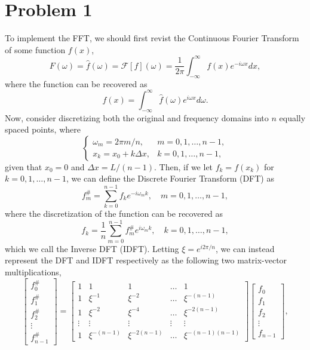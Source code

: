 \documentclass[11pt]{article}
\begin{document}
\section{Problem 1}
To implement the FFT, we should first revist the Continuous Fourier Transform of some function $f(x)$,
	\begin{equation*}
		F(\omega) = \hat{f}(\omega) = \mathcal{F}\left[f\right](\omega) = \frac{1}{2\pi}\int_{-\infty}^{\infty}{f(x)e^{-i\omega x}dx},
	\end{equation*}
where the function can be recovered as
	\begin{equation*}
		f(x) = \int_{-\infty}^{\infty}{\hat{f}(\omega)e^{i\omega x}d\omega}.
	\end{equation*}
Now, consider discretizing both the original and frequency domains into $n$ equally spaced points, where
	\begin{equation}
		\begin{cases}
			\omega_m = 2\pi m/n, & m = 0,1,\dots,n-1, \\
			x_k = x_0 + k\Delta x, & k = 0,1,\dots,n-1,
		\end{cases}
			\label{eq:5}
	\end{equation}
given that $x_0 = 0$ and $\Delta x = L/(n-1)$. Then, if we let $f_k = f(x_k)$ for $k = 0,1,\dots,n-1$,
we can define the Discrete Fourier Transform (DFT) as
	\begin{equation*}
		f_{m}^{\#} = \sum_{k=0}^{n-1}{f_ke^{-i\omega_mk}}, \quad m = 0,1,\dots,n-1,
	\end{equation*}
where the discretization of the function can be recovered as
	\begin{equation*}
		f_{k} = \frac{1}{n}\sum_{m=0}^{n-1}{f_{m}^{\#}e^{i\omega_mk}}, \quad k = 0,1,\dots,n-1,
	\end{equation*}
which we call the Inverse DFT (IDFT). Letting $\xi = e^{i 2\pi/n}$, we can instead represent the DFT and
IDFT respectively as the following two matrix-vector multiplications,
\begin{equation*}
	\begin{bmatrix}
		f_{0}^{\#} \\
		f_{1}^{\#} \\
		f_{2}^{\#} \\
		\vdots \\
		f_{n-1}^{\#}
	\end{bmatrix}
	=
	\begin{bmatrix}
		1 & 1 & 1 & \dots & 1 \\
		1 & \xi^{-1} & \xi^{-2} & \dots & \xi^{-(n-1)} \\
		1 & \xi^{-2} & \xi^{-4} & \dots & \xi^{-2(n-1)} \\
		\vdots & \vdots & \vdots & \vdots & \vdots \\
		1 & \xi^{-(n-1)} & \xi^{-2(n-1)} & \dots & \xi^{-(n-1)(n-1)} 
	\end{bmatrix}
	\begin{bmatrix}
		f_{0} \\
		f_{1} \\
		f_{2} \\
		\vdots \\
		f_{n-1}
	\end{bmatrix},
\end{equation*}
\end{document}
